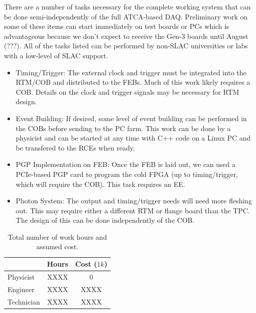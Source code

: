 There are a number of tasks necessary for the complete working system that can be done semi-independently of the full ATCA-based DAQ.  Preliminary work on some of these items can start immediately on test boards or PCs which is advantageous because we don't expect to receive the Gen-3 boards until August (???).  All of the tasks listed can be performed by non-SLAC universities or labs with a low-level of SLAC support.  
\begin{itemize}
\item Timing/Trigger:  The external clock and trigger must be integrated into the RTM/COB and distributed to the FEBs.  Much of this work likely requires a COB.  Details on the clock and trigger signals may be necessary for RTM design.   
\item Event Building:  If desired, some level of event building can be performed in the COBs before sending to the PC farm.  This work can be done by a physicist and can be started at any time with C++ code on a Linux PC and be transfered to the RCEs when ready.   
\item PGP Implementation on FEB:    Once the FEB is laid out,  we can used a PCIe-based PGP card to program  the cold FPGA (up to timing/trigger, which will require the COB).  This task requires an EE.    
\item Photon System:  The output and timing/trigger needs will need more fleshing out.  This may require either a different RTM or flange board than the TPC.  The design of this can be done independently of the COB.  
\end{itemize}


\begin{table}[tbh]
\begin{center}
\begin{tabular}{|l|c|c|}   
\hline \hline 
    & Hours  & Cost ($1k$) \\      
\hline
   Physicist           & XXXX&0 \\ 
   Engineer           & XXXX& XXXX\\ 
   Technician        & XXXX&XXXX \\ 
\hline \hline
\end{tabular}
\caption[]{Total number of work hours and assumed cost.}
\label{tab:labor} 
\end{center}
\end{table}



